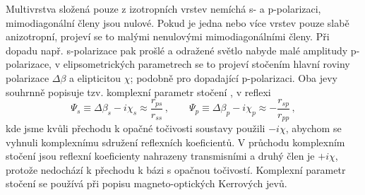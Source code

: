 Multivrstva složená pouze z izotropních vrstev nemíchá s- a p-polarizaci, mimodiagonální členy jsou nulové.
Pokud je jedna nebo více vrstev pouze slabě anizotropní, projeví se to malými nenulovými mimodiagonálními členy.
Při dopadu např. s-polarizace pak prošlé a odražené světlo nabyde malé amplitudy p-polarizace, v elipsometrických parametrech se to projeví stočením hlavní roviny polarizace $\Delta \beta$ a elipticitou $\chi$; podobně pro dopadající p-polarizaci. 
Oba jevy souhrnně popisuje tzv. komplexní parametr stočení , v reflexi
\begin{equation}
\label{eqn:komplexni-rotace}
    \Psi_s \equiv \Delta \beta_s - i \chi_s \approx \frac{r_{ps}}{r_{ss}} 
    \,, \qquad \Psi_p \equiv \Delta \beta_p - i \chi_p \approx -\frac{r_{sp}}{r_{pp}} \,,
\end{equation}
kde jsme kvůli přechodu k opačné točivosti soustavy použili $-i\chi$, abychom se vyhnuli komplexnímu sdružení reflexních koeficientů.
V průchodu komplexním stočení jsou reflexní koeficienty nahrazeny transmisními a druhý člen je $+i\chi$, protože nedochází k přechodu k bázi s opačnou točivostí.
Komplexní parametr stočení se používá při popisu magneto-optických Kerrových jevů.
